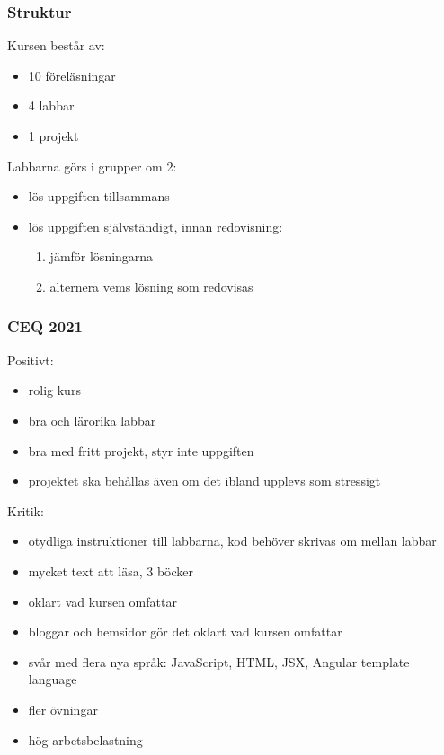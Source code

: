 \documentclass[aspectratio=1610]{beamer}
\begin{document}
\begin{frame}
  \frametitle{Struktur}
Kursen består av:
\begin{itemize}
  \item 10 föreläsningar
  \item 4 labbar
  \item 1 projekt
\end{itemize}
\vspace{2mm}
Labbarna görs i grupper om 2:
\begin{itemize}
 \item lös uppgiften tillsammans
 \item lös uppgiften självständigt, innan redovisning:
   \begin{enumerate}
     \item jämför lösningarna
     \item alternera vems lösning som redovisas
   \end{enumerate}
\end{itemize}
\end{frame}

\begin{frame}
  \frametitle{CEQ 2021}
Positivt:
\begin{itemize}
  \item rolig kurs
  \item bra och lärorika labbar
  \item bra med fritt projekt, styr inte uppgiften
  \item projektet ska behållas även om det ibland upplevs som stressigt
\end{itemize}
\vspace{2mm}
Kritik:
\begin{itemize}
  \item otydliga instruktioner till labbarna, kod behöver skrivas om mellan labbar
  \item mycket text att läsa, 3 böcker
  \item oklart vad kursen omfattar
  \item bloggar och hemsidor gör det oklart vad kursen omfattar
  \item svår med flera nya språk: JavaScript, HTML, JSX, Angular template language
  \item fler övningar
  \item hög arbetsbelastning
\end{itemize}
\end{frame}
\end{document}
